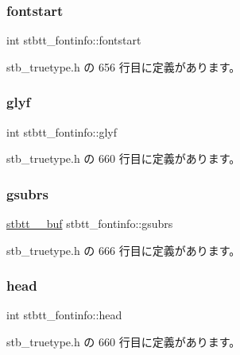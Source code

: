 \subsubsection{\texorpdfstring{fontstart}{fontstart}}
{\footnotesize\ttfamily int stbtt\+\_\+fontinfo\+::fontstart}



 stb\+\_\+truetype.\+h の 656 行目に定義があります。

\mbox{\label{structstbtt__fontinfo_a5de2129e0a415748920f6aa10ceee6e5}} 
\subsubsection{\texorpdfstring{glyf}{glyf}}
{\footnotesize\ttfamily int stbtt\+\_\+fontinfo\+::glyf}



 stb\+\_\+truetype.\+h の 660 行目に定義があります。

\mbox{\label{structstbtt__fontinfo_afc5bfc4a52ad0e3879f0f81a372da7fb}} 
\subsubsection{\texorpdfstring{gsubrs}{gsubrs}}
{\footnotesize\ttfamily \mbox{\hyperlink{structstbtt____buf}{stbtt\+\_\+\+\_\+buf}} stbtt\+\_\+fontinfo\+::gsubrs}



 stb\+\_\+truetype.\+h の 666 行目に定義があります。

\mbox{\label{structstbtt__fontinfo_ab76ed2f4cbd8fcbd8465ca5f88e7e2b9}} 
\subsubsection{\texorpdfstring{head}{head}}
{\footnotesize\ttfamily int stbtt\+\_\+fontinfo\+::head}



 stb\+\_\+truetype.\+h の 660 行目に定義があります。

